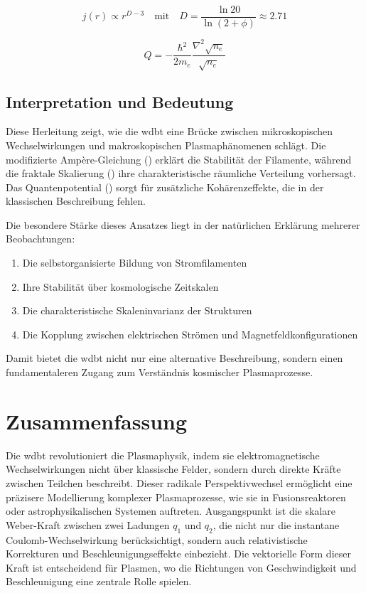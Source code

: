 \begin{equation}
\label{eq:fractal_scaling}
j(r) \propto r^{D-3} \quad \text{mit} \quad D = \frac{\ln 20}{\ln(2+\phi)} \approx 2.71
\end{equation}

\begin{equation}
\label{eq:quantenpotential_plasma}
Q = -\frac{\hbar^2}{2m_e} \frac{\nabla^2 \sqrt{n_e}}{\sqrt{n_e}}
\end{equation}

\subsection{Interpretation und Bedeutung}
Diese Herleitung zeigt, wie die \gls{wdbt} eine Brücke zwischen mikroskopischen Wechselwirkungen und makroskopischen Plasmaphänomenen schlägt. Die modifizierte
Ampère-Gleichung () erklärt die Stabilität der Filamente, während die fraktale Skalierung () ihre charakteristische räumliche
Verteilung vorhersagt. Das Quantenpotential () sorgt für zusätzliche Kohärenzeffekte, die in der klassischen Beschreibung fehlen.

Die besondere Stärke dieses Ansatzes liegt in der natürlichen Erklärung mehrerer Beobachtungen:

\begin{enumerate}
    \item Die selbstorganisierte Bildung von Stromfilamenten
    \item Ihre Stabilität über kosmologische Zeitskalen
    \item Die charakteristische Skaleninvarianz der Strukturen
    \item Die Kopplung zwischen elektrischen Strömen und Magnetfeldkonfigurationen
\end{enumerate}

Damit bietet die \gls{wdbt} nicht nur eine alternative Beschreibung, sondern einen fundamentaleren Zugang zum Verständnis kosmischer Plasmaprozesse.

\section{Zusammenfassung}
Die \gls{wdbt} revolutioniert die Plasmaphysik, indem sie elektromagnetische Wechselwirkungen nicht über klassische Felder, sondern durch direkte Kräfte zwischen Teilchen beschreibt.
Dieser radikale Perspektivwechsel ermöglicht eine präzisere Modellierung komplexer Plasmaprozesse, wie sie in Fusionsreaktoren oder astrophysikalischen Systemen auftreten.
Ausgangspunkt ist die skalare Weber-Kraft zwischen zwei Ladungen $q_1$ und $q_2$, die nicht nur die instantane Coulomb-Wechselwirkung berücksichtigt, sondern auch relativistische
Korrekturen und Beschleunigungseffekte einbezieht. Die vektorielle Form dieser Kraft ist entscheidend für Plasmen, wo die Richtungen von Geschwindigkeit und Beschleunigung eine
zentrale Rolle spielen.

